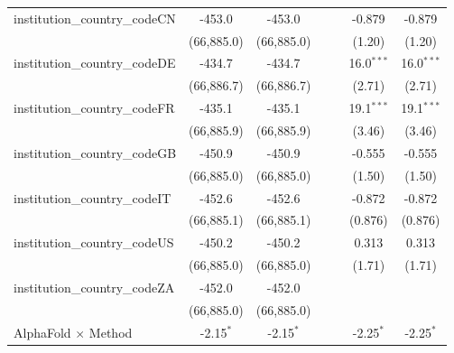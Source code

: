\begin{tabular}{lcccccc}
   institution\_country\_codeCN          & -453.0        & -453.0        &               &               & -0.879        & -0.879\\   
                                         & (66,885.0)    & (66,885.0)    &               &               & (1.20)        & (1.20)\\   
   institution\_country\_codeDE          & -434.7        & -434.7        &               &               & 16.0$^{***}$  & 16.0$^{***}$\\   
                                         & (66,886.7)    & (66,886.7)    &               &               & (2.71)        & (2.71)\\   
   institution\_country\_codeFR          & -435.1        & -435.1        &               &               & 19.1$^{***}$  & 19.1$^{***}$\\   
                                         & (66,885.9)    & (66,885.9)    &               &               & (3.46)        & (3.46)\\   
   institution\_country\_codeGB          & -450.9        & -450.9        &               &               & -0.555        & -0.555\\   
                                         & (66,885.0)    & (66,885.0)    &               &               & (1.50)        & (1.50)\\   
   institution\_country\_codeIT          & -452.6        & -452.6        &               &               & -0.872        & -0.872\\   
                                         & (66,885.1)    & (66,885.1)    &               &               & (0.876)       & (0.876)\\   
   institution\_country\_codeUS          & -450.2        & -450.2        &               &               & 0.313         & 0.313\\   
                                         & (66,885.0)    & (66,885.0)    &               &               & (1.71)        & (1.71)\\   
   institution\_country\_codeZA          & -452.0        & -452.0        &               &               &               &   \\   
                                         & (66,885.0)    & (66,885.0)    &               &               &               &   \\   
   AlphaFold $\times$ Method             & -2.15$^{*}$   & -2.15$^{*}$   &               &               & -2.25$^{*}$   & -2.25$^{*}$\\   

\end{tabular}
